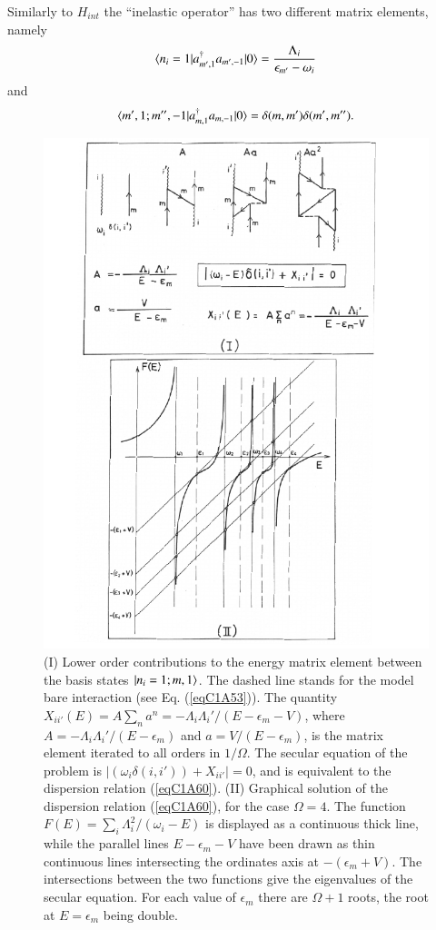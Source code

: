Similarly to $H_{int}$ the ``inelastic operator'' has two different matrix elements, namely 
 \begin{align}\label{eqC1A54} 
 \langle {n_i=1|a^\dagger_{m',1}a_{m',-1}|0} \rangle=\frac{\Lambda_i}{\epsilon_{m'}-\omega_i}
 \end{align} 
 and
  \begin{align}\label{eqC1A55} 
 \langle {m',1;m'',-1|a^\dagger_{m,1}a_{m,-1}|0} \rangle=\delta(m,m')\delta(m',m'').
  \end{align} 
    \begin{figure}
    \centerline {
    \includegraphics*[width=12cm]{introduccion/figs/fig21}
    }
    \caption{(I) Lower order contributions to the energy matrix element between the basis states $|{n_i=1;m,1} \rangle$. The dashed line stands for the model bare interaction (see Eq. (\ref{eqC1A53})). The quantity $X_{ii'}(E)=A\sum_na^n=-\Lambda_i\Lambda_i'/(E-\epsilon_m-V)$, where $A=-\Lambda_i\Lambda_i'/(E-\epsilon_m)$ and $a=V/(E-\epsilon_m)$, is the matrix element iterated to all orders in $1/\Omega$. The secular equation of the problem is $|(\omega_i\delta(i,i'))+X_{ii'}|=0$, and is equivalent to the dispersion relation (\ref{eqC1A60}). (II) Graphical solution of the dispersion relation (\ref{eqC1A60}), for the case $\Omega=4$. The function $F(E)=\sum_i\Lambda_i^2/(\omega_i-E)$ is displayed as a continuous thick line, while the parallel lines $E-\epsilon_m-V$ have been drawn as thin continuous lines intersecting the ordinates axis at $-(\epsilon_m+V)$. The intersections between the two functions give the eigenvalues of the secular equation. For each value of $\epsilon_m$ there are $\Omega+1$ roots, the root at $E=\epsilon_m$ being double.}
    \label{figC1A4}
    \end{figure}
